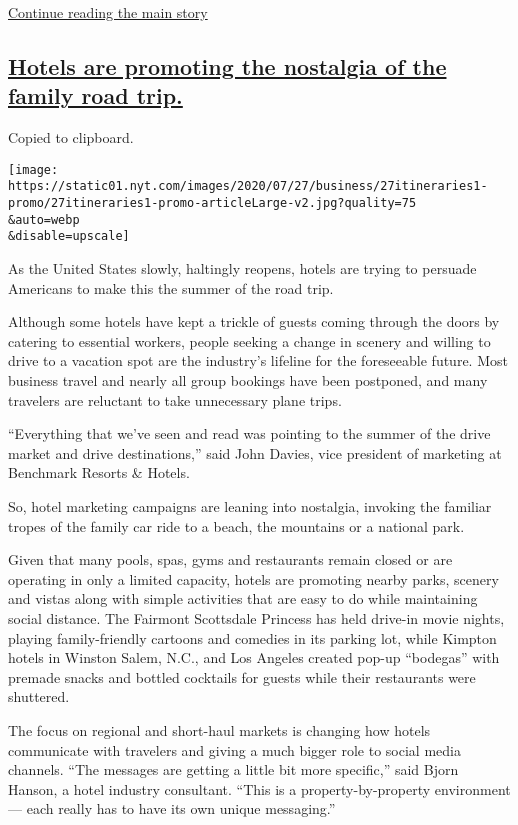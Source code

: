 \protect\hyperlink{after-dfp-ad-mid2}{Continue reading the main story}

\hypertarget{hotels-are-promoting-the-nostalgia-of-the-family-road-trip}{%
\subsection{\texorpdfstring{\protect\hyperlink{hotels-are-promoting-the-nostalgia-of-the-family-road-trip}{Hotels
are promoting the nostalgia of the family road
trip.}}{Hotels are promoting the nostalgia of the family road trip.}}\label{hotels-are-promoting-the-nostalgia-of-the-family-road-trip}}

Copied to clipboard.

\texttt{[image: https://static01.nyt.com/images/2020/07/27/business/27itineraries1-promo/27itineraries1-promo-articleLarge-v2.jpg?quality=75\\\&auto=webp\\\&disable=upscale]}

As the United States slowly, haltingly reopens, hotels are trying to
persuade Americans to make this the summer of the road trip.

Although some hotels have kept a trickle of guests coming through the
doors by catering to essential workers, people seeking a change in
scenery and willing to drive to a vacation spot are the industry's
lifeline for the foreseeable future. Most business travel and nearly all
group bookings have been postponed, and many travelers are reluctant to
take unnecessary plane trips.

``Everything that we've seen and read was pointing to the summer of the
drive market and drive destinations,'' said John Davies, vice president
of marketing at Benchmark Resorts \& Hotels.

So, hotel marketing campaigns are leaning into nostalgia, invoking the
familiar tropes of the family car ride to a beach, the mountains or a
national park.

Given that many pools, spas, gyms and restaurants remain closed or are
operating in only a limited capacity, hotels are promoting nearby parks,
scenery and vistas along with simple activities that are easy to do
while maintaining social distance. The Fairmont Scottsdale Princess has
held drive-in movie nights, playing family-friendly cartoons and
comedies in its parking lot, while Kimpton hotels in Winston Salem,
N.C., and Los Angeles created pop-up ``bodegas'' with premade snacks and
bottled cocktails for guests while their restaurants were shuttered.

The focus on regional and short-haul markets is changing how hotels
communicate with travelers and giving a much bigger role to social media
channels. ``The messages are getting a little bit more specific,'' said
Bjorn Hanson, a hotel industry consultant. ``This is a
property-by-property environment --- each really has to have its own
unique messaging.''

